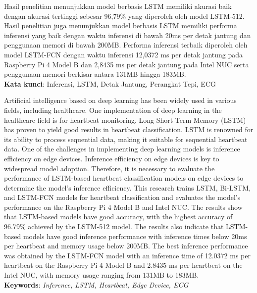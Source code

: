 \documentclass{skripsi}
\begin{document}
{  Hasil penelitian menunjukkan model berbasis LSTM memiliki akurasi baik dengan akurasi tertinggi sebesar 96,79\% yang diperoleh oleh model LSTM-512.
  Hasil penelitian juga menunjukkan model berbasis LSTM memiliki performa inferensi yang baik dengan waktu inferensi di bawah 20ms per detak jantung dan penggunaan memori di bawah 200MB.
  Performa inferensi terbaik diperoleh oleh model LSTM-FCN dengan waktu inferensi 12,0372 ms per detak jantung pada Raspberry Pi 4 Model B dan 2,8435 ms per detak jantung pada Intel NUC serta penggunaan memori berkisar antara 131MB hingga 183MB.\\


  \noindent
  \textbf{Kata kunci}: Inferensi, LSTM, Detak Jantung, Perangkat Tepi, ECG

}

{\abstracteng

  \noindent
Artificial intelligence based on deep learning has been widely used in various fields, including healthcare.
One implementation of deep learning in the healthcare field is for heartbeat monitoring.
Long Short-Term Memory (LSTM) has proven to yield good results in heartbeat classification.
LSTM is renowned for its ability to process sequential data, making it suitable for sequential heartbeat data.
One of the challenges in implementing deep learning models is inference efficiency on edge devices.
Inference efficiency on edge devices is key to widespread model adoption.
Therefore, it is necessary to evaluate the performance of LSTM-based heartbeat classification models on edge devices to determine the model's inference efficiency.
This research trains LSTM, Bi-LSTM, and LSTM-FCN models for heartbeat classification and evaluates the model's performance on the Raspberry Pi 4 Model B and Intel NUC.
The results show that LSTM-based models have good accuracy, with the highest accuracy of 96.79\% achieved by the LSTM-512 model.
The results also indicate that LSTM-based models have good inference performance with inference times below 20ms per heartbeat and memory usage below 200MB.
The best inference performance was obtained by the LSTM-FCN model with an inference time of 12.0372 ms per heartbeat on the Raspberry Pi 4 Model B and 2.8435 ms per heartbeat on the Intel NUC, with memory usage ranging from 131MB to 183MB.\\

  \noindent
  \textbf{Keywords}: \emph{Inference, LSTM, Heartbeat, Edge Device, ECG}

}
\end{document}

